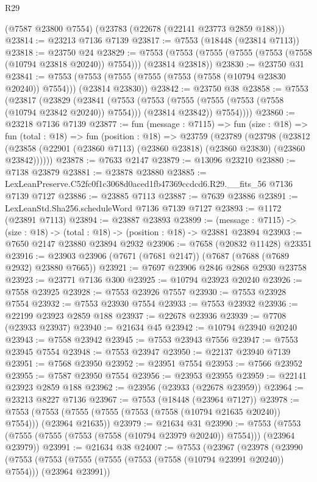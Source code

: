 \begin{lexlean}{R29}
\begin{coremodule}
    (@7587 @23800 @7554)
    (@23783 (@22678 (@22141 @23773 @2859 @188)))
@23814 := @23213 @7136 @7139
@23817 := @7553 (@18448 (@23814 @7113))
@23818 := @23750 @24
@23829 := @7553 (@7553 (@7555 (@7555 (@7553 (@7558 (@10794 @23818 @20240)) @7554))) (@23814 @23818))
@23830 := @23750 @31
@23841 := @7553 (@7553 (@7555 (@7555 (@7553 (@7558 (@10794 @23830 @20240)) @7554))) (@23814 @23830))
@23842 := @23750 @38
@23858 := @7553
    (@23817
      (@23829
        (@23841
          (@7553
            (@7553 (@7555 (@7555 (@7553 (@7558 (@10794 @23842 @20240)) @7554))) (@23814 @23842))
            @7554))))
@23860 := @23218 @7136 @7139
@23877 := fun (message : @7115) =>
  fun (size : @18) =>
  fun (total : @18) =>
  fun (position : @18) =>
  @23759
    (@23789
      (@23798
        (@23812 (@23858 (@22901 (@23860 @7113) (@23860 @23818) (@23860 @23830) (@23860 @23842))))))
@23878 := @7633 @2147
@23879 := @13096 @23210
@23880 := @7138 @23879
@23881 := @23878 @23880
@23885 := LexLeanPreserve.C52fc0f1c3068d0aced1fb47369ccdcd6.R29.__fits_56 @7136 @7139 @7127
@23886 := @23885 @7113
@23887 := @7639 @23886
@23891 := LexLeanStd.Sha256.scheduleWord @7136 @7139 @7127
@23893 := @1172 (@23891 @7113)
@23894 := @23887 @23893
@23899 := (message : @7115) -> (size : @18) -> (total : @18) -> (position : @18) -> @23881 @23894
@23903 := @7650 @2147 @23880 @23894 @2932
@23906 := @7658 (@20832 @11428) @23351
@23916 := @23903 @23906 (@7671 (@7681 @2147)) (@7687 (@7688 (@7689 @2932) @23880 @7665))
@23921 := @7697 @23906 @2846 @2868 @2930 @23758
@23923 := @23771 @7136 @300
@23925 := @10794 @23923 @20240
@23926 := @7558 @23925
@23928 := @7553 @23926 @7557
@23930 := @7553 @23928 @7554
@23932 := @7553 @23930 @7554
@23933 := @7553 @23932
@23936 := @22199 @23923 @2859 @188
@23937 := @22678 @23936
@23939 := @7708 (@23933 @23937)
@23940 := @21634 @45
@23942 := @10794 @23940 @20240
@23943 := @7558 @23942
@23945 := @7553 @23943 @7556
@23947 := @7553 @23945 @7554
@23948 := @7553 @23947
@23950 := @22137 @23940 @7139
@23951 := @7568 @23950
@23952 := @23951 @7554
@23953 := @7566 @23952
@23955 := @7587 @23950 @7554
@23956 := @23953 @23955
@23959 := @22141 @23923 @2859 @188
@23962 := @23956 (@23933 (@22678 @23959))
@23964 := @23213 @8227 @7136
@23967 := @7553 (@18448 (@23964 @7127))
@23978 := @7553 (@7553 (@7555 (@7555 (@7553 (@7558 (@10794 @21635 @20240)) @7554))) (@23964 @21635))
@23979 := @21634 @31
@23990 := @7553 (@7553 (@7555 (@7555 (@7553 (@7558 (@10794 @23979 @20240)) @7554))) (@23964 @23979))
@23991 := @21634 @38
@24007 := @7553
    (@23967
      (@23978
        (@23990
          (@7553
            (@7553 (@7555 (@7555 (@7553 (@7558 (@10794 @23991 @20240)) @7554))) (@23964 @23991))

\end{coremodule}
\end{lexlean}
